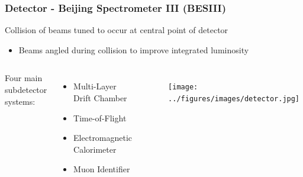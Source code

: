\documentclass[t]{beamer}
\newcommand{\addframe}[2]{
\begin{frame}
\frametitle{#1}
#2
\end{frame}
}
\newcommand{\additem}[1]{
\begin{itemize}
\item #1
\end{itemize}
}
\begin{document}
\addframe{Detector - Beijing Spectrometer III (BESIII)}{
Collision of beams tuned to occur at central point of detector
\additem{Beams angled during collision to improve integrated luminosity}

\vspace{-0.3cm}

\begin{columns}

\column{.5\textwidth} %

Four main subdetector systems:
\begin{itemize}
\item Multi-Layer Drift Chamber
\item Time-of-Flight
\item Electromagnetic Calorimeter
\item Muon Identifier 
\end{itemize}

\vspace{-0.3cm}

\begin{figure}
\texttt{[image: ../figures/images/detector.jpg]}
\end{figure}

\column{.5\textwidth} %

\begin{figure}
\includegraphics[width=\linewidth]{../figures/images/detector.pdf}
\end{figure}

\end{columns}

}
\end{document}
